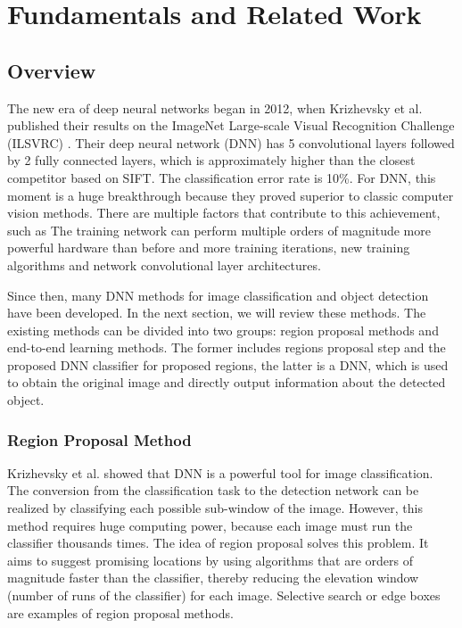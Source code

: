 
\chapter{Fundamentals and Related Work}
\label{sec:fundamentals_related-work}
\section{Overview}

The new era of deep neural networks began in 2012, when Krizhevsky et al. published
their results\cite{krizhevsky_imagenet_2017} on the ImageNet Large-scale Visual Recognition Challenge (ILSVRC)\cite{deng_imagenet_2009} . Their deep neural network (DNN) has 5 convolutional layers followed by 2 fully connected layers, which is approximately higher than the closest competitor based on SIFT\cite{sanchez_high-dimensional_2011}. The classification error rate is 10\%. For DNN, this moment is a huge breakthrough because they proved superior to classic computer vision methods. There are multiple factors that contribute to this achievement, such as
The training network can perform multiple orders of magnitude more powerful hardware than before and more training iterations, new training algorithms and network convolutional layer architectures.

Since then, many DNN methods for image classification and object detection have been developed. In the next section, we will review these methods. The existing methods can be divided into two groups: region proposal methods and end-to-end learning methods. The former includes regions proposal step and the proposed DNN classifier for proposed regions, the latter is a DNN, which is used to obtain the original image and directly output information about the detected object.
\subsection{Region Proposal Method}

Krizhevsky et al.\cite{krizhevsky_imagenet_2017} showed that DNN is a powerful tool for image classification. The conversion from the classification task to the detection network can be realized by classifying each possible sub-window of the image. However, this method requires huge computing power, because each image must run the classifier thousands times. The idea of region proposal solves this problem. It aims to suggest promising locations by using algorithms that are orders of magnitude faster than the classifier, thereby reducing the elevation window (number of runs of the classifier) for each image. Selective search\cite{uijlings_selective_2013} or edge boxes\cite{fleet_edge_2014} are examples of region proposal methods. 

